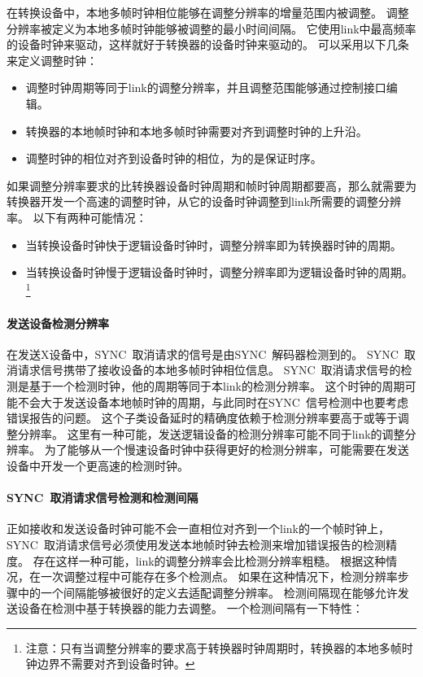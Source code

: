 \documentclass[UTF8]{ctexart}
\begin{document}
在转换设备中，本地多帧时钟相位能够在调整分辨率的增量范围内被调整。
调整分辨率被定义为本地多帧时钟能够被调整的最小时间间隔。
它使用link中最高频率的设备时钟来驱动，这样就好于转换器的设备时钟来驱动的。
可以采用以下几条来定义调整时钟：

\begin{itemize}
\item 调整时钟周期等同于link的调整分辨率，并且调整范围能够通过控制接口编辑。
\item 转换器的本地帧时钟和本地多帧时钟需要对齐到调整时钟的上升沿。
\item 调整时钟的相位对齐到设备时钟的相位，为的是保证时序。
\end{itemize}

如果调整分辨率要求的比转换器设备时钟周期和帧时钟周期都要高，那么就需要为转换器开发一个高速的调整时钟，从它的设备时钟调整到link所需要的调整分辨率。
以下有两种可能情况：

\begin{itemize}
\item 当转换设备时钟快于逻辑设备时钟时，调整分辨率即为转换器时钟的周期。
\item 当转换设备时钟慢于逻辑设备时钟时，调整分辨率即为逻辑设备时钟的周期。\footnote{注意：只有当调整分辨率的要求高于转换器时钟周期时，转换器的本地多帧时钟边界不需要对齐到设备时钟。}
\end{itemize}

\paragraph{发送设备检测分辨率}

在发送X设备中，SYNC~取消请求的信号是由SYNC~解码器检测到的。
SYNC~取消请求信号携带了接收设备的本地多帧时钟相位信息。
SYNC~取消请求信号的检测是基于一个检测时钟，他的周期等同于本link的检测分辨率。
这个时钟的周期可能不会大于发送设备本地帧时钟的周期，与此同时在SYNC~信号检测中也要考虑错误报告的问题。
这个子类设备延时的精确度依赖于检测分辨率要高于或等于调整分辨率。
这里有一种可能，发送逻辑设备的检测分辨率可能不同于link的调整分辨率。
为了能够从一个慢速设备时钟中获得更好的检测分辨率，可能需要在发送设备中开发一个更高速的检测时钟。

\paragraph{SYNC~取消请求信号检测和检测间隔}

正如接收和发送设备时钟可能不会一直相位对齐到一个link的一个帧时钟上，SYNC~取消请求信号必须使用发送本地帧时钟去检测来增加错误报告的检测精度。
存在这样一种可能，link的调整分辨率会比检测分辨率粗糙。
根据这种情况，在一次调整过程中可能存在多个检测点。
如果在这种情况下，检测分辨率步骤中的一个间隔能够被很好的定义去适配调整分辨率。
检测间隔现在能够允许发送设备在检测中基于转换器的能力去调整。
一个检测间隔有一下特性：
\end{document}

